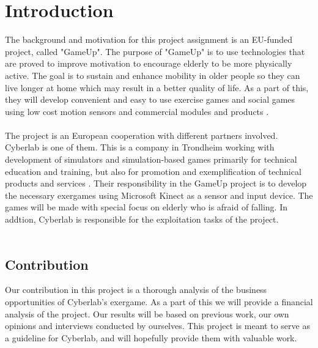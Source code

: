 \chapter{Introduction}
The background and motivation for this project assignment is an EU-funded project, called "GameUp". The purpose of "GameUp" is to use technologies that are proved to improve motivation to encourage elderly to be more physically active. The goal is to sustain and enhance mobility in older people so they can live longer at home which may result in a better quality of life. As a part of this, they will develop convenient and easy to use exercise games and social games using low cost motion sensors and commercial modules and products \cite{gameup}.\\ \\ The project is an European cooperation with different partners involved. Cyberlab is one of them. This is a company in Trondheim working with development of simulators and simulation-based games primarily for technical education and training, but also for promotion and exemplification of technical products and services \cite{cyberlab}. Their responsibility in the GameUp project is to develop the necessary exergames using Microsoft Kinect as a sensor and input device. The games will be made with special focus on elderly who is afraid of falling. In addtion, Cyberlab is responsible for the exploitation tasks of the project.  \\ \\

\section{Contribution}
Our contribution in this project is a thorough analysis of the business opportunities of Cyberlab’s exergame. As a part of this we will provide a financial analysis of the project. Our results will be based on previous work, our own opinions and interviews conducted by ourselves. This project is meant to serve as a guideline for Cyberlab, and will hopefully provide them with valuable work.  

